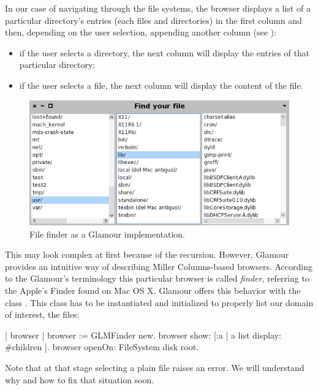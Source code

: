 \documentclass[a4paper,10pt,twoside]{book}
\begin{document}
In our case of navigating through the file systems, the browser displays a list
of a particular directory's entries (each files and directories) in
the first column and then, depending on the user selection, appending
another column (see ):

\begin{itemize}
\item if the user selects a directory, the next column will display
  the entries of that particular directory;
\item if the user selects a file, the next column will display the
  content of the file.
\end{itemize}

\begin{figure}
  \begin{center}
    \includegraphics[scale=0.48]{cs_file_finder_final}
    \caption{File finder as a Glamour
      implementation. \label{fig:casestudies/file_finder}}
  \end{center}
\end{figure}

This may look complex at first because of the recursion. However, Glamour provides an intuitive way of describing Miller Columns-based browsers. According to the Glamour's terminology this particular browser is called \emph{finder}, referring to the Apple's Finder found
on Mac OS X. 
Glamour offers this behavior with the class . This class has to be instantiated and initialized to properly list our domain of interest, the files:

\begin{code}{}
| browser |
browser := GLMFinder new.
browser show: [:a | 
   a list
	  display: #children ].
browser openOn: FileSystem disk root.
\end{code}

Note that at that stage selecting a plain file raises an error. We will understand why and how to fix that situation soon.
\end{document}
